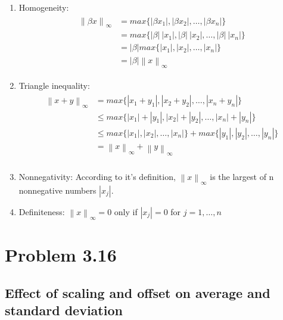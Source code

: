 \documentclass{article}
\newcommand{\norm}[1]{\left\lVert#1\right\rVert}
\begin{document}
\begin{enumerate}[label=(\alph*)]
    \item Homogeneity:
    \begin{align*}
        \begin{split}
            \norm{\beta x}_\infty & = max\{|\beta x_1|,|\beta x_2|,\ldots,|\beta x_n|\}\\
            & = max\{|\beta|\ |x_1|,|\beta|\ |x_2|,\ldots,|\beta|\ |x_n|\}\\
            & = |\beta|max\{|x_1|,|x_2|,\ldots,|x_n|\}\\
            & = |\beta|\norm{x}_\infty
        \end{split}
    \end{align*}
    \item Triangle inequality:
    \begin{align*}
        \begin{split}
            \norm{x + y}_\infty & = max\{|x_1+y_1| , |x_2+y_2| , \ldots , |x_n+y_n|\}\\
            & \leq max\{|x_1| + |y_1| ,|x_2| + |y_2|,  \ldots , |x_n| + |y_n|\}\\
            & \leq max\{|x_1|,|x_2|,\ldots,|x_n|\} + max\{|y_1|,|y_2|,\ldots,|y_n|\}\\
            & = \norm{x}_\infty + \norm{y}_\infty\\
        \end{split}
    \end{align*}
    \item Nonnegativity: According to it's definition, $\norm{x}_\infty$ is the largest of n nonnegative numbers $|x_j|$.
    \item Definiteness: $\norm{x}_\infty = 0$ only if $|x_j| = 0$ for $j = 1,\ldots,n$
\end{enumerate}
\section*{Problem 3.16}
\subsection*{Effect of scaling and offset on average and standard deviation}
\end{document}

